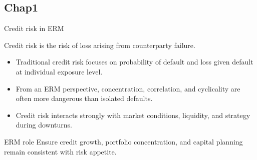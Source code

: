 \documentclass[aspectratio=169, 10pt]{beamer} %
\begin{document}
\subsection{Chap1}
\begin{frame}{}

\centering
\color{blue} 

\end{frame}
\begin{frame}{Credit risk in ERM}

Credit risk is the risk of loss arising from counterparty failure.

\medskip

\begin{itemize}
  \item[$\bullet$] Traditional credit risk focuses on probability of default
  and loss given default at individual exposure level.

  \item[$\bullet$] From an ERM perspective, concentration, correlation, and
  cyclicality are often more dangerous than isolated defaults.

  \item[$\bullet$] Credit risk interacts strongly with market conditions,
  liquidity, and strategy during downturns.
\end{itemize}

\begin{block}{ERM role}
Ensure credit growth, portfolio concentration, and capital planning remain
consistent with risk appetite.
\end{block}

\end{frame}
\end{document}
